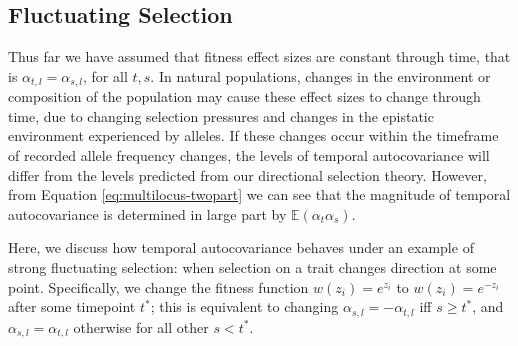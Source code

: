 \documentclass[11pt]{article}
\newcommand{\E}{\mathbb{E}}
\begin{document}
\subsection{Fluctuating Selection}
\label{sec:fluct-sel}

Thus far we have assumed that fitness effect sizes are constant through time,
that is $\alpha_{t,l} =  \alpha_{s,l}$, for all $t, s$. In natural populations,
changes in the environment or composition of the population may cause these
effect sizes to change through time, due to changing selection pressures and
changes in the epistatic environment experienced by alleles. If these changes
occur within the timeframe of recorded allele frequency changes, the levels of
temporal autocovariance will differ from the levels predicted from our
directional selection theory. However, from Equation
\eqref{eq:multilocus-twopart} we can see that the magnitude of temporal
autocovariance is determined in large part by $\E(\alpha_t \alpha_s)$.

Here, we discuss how temporal autocovariance behaves under an example of strong
fluctuating selection: when selection on a trait changes direction at some
point. Specifically, we change the fitness function $w(z_i) = e^{z_i}$ to
$w(z_i) = e^{-z_i}$ after some timepoint $t^*$; this is equivalent to changing
$\alpha_{s,l} = - \alpha_{t,l}$ iff $s \ge t^*$, and $\alpha_{s,l} =
\alpha_{t,l}$ otherwise for all other $s < t^*$.
\end{document}
